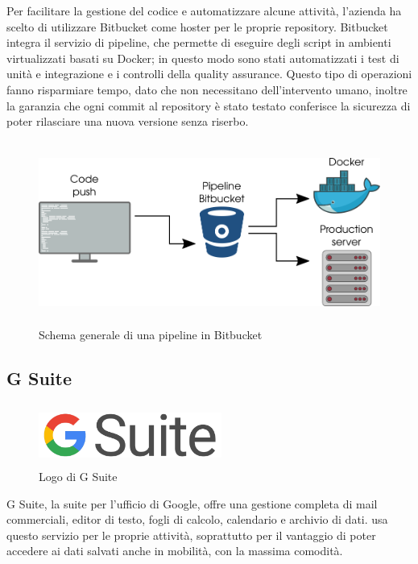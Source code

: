    Per facilitare la gestione del codice e automatizzare alcune attività, l'azienda ha scelto di utilizzare Bitbucket come hoster per le proprie repository. Bitbucket integra il servizio di pipeline, che permette di eseguire degli script in ambienti virtualizzati basati su Docker; in questo modo sono stati automatizzati i test di unità e integrazione e i controlli della quality assurance. Questo tipo di operazioni fanno risparmiare tempo, dato che non necessitano dell'intervento umano, inoltre la garanzia che ogni commit al repository è stato testato conferisce la sicurezza di poter rilasciare una nuova versione senza riserbo.
   \begin{figure}[H]
      \begin{center}
         \includegraphics[width=15cm,height=6cm,keepaspectratio]{immagini/bitbucket-pipeline}
      \end{center}
      \caption{Schema generale di una pipeline in Bitbucket}\label{pipelinebitbucket}
   \end{figure}


   \subsection{G Suite}
   \begin{figure}[H]
      \begin{center}
         \includegraphics[width=6cm,height=2cm,keepaspectratio]{immagini/gsuite-logo}
      \end{center}
      \caption{Logo di G Suite}\label{logogsuite}
   \end{figure}
   G Suite, la suite per l'ufficio di Google, offre una gestione completa di mail commerciali, editor di testo, fogli di calcolo, calendario e archivio di dati. \nomeAzienda{} usa questo servizio per le proprie attività, soprattutto per il vantaggio di poter accedere ai dati salvati anche in mobilità, con la massima comodità.


